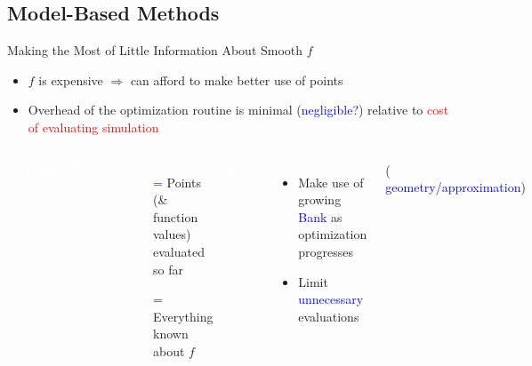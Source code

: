 \documentclass[handout,aspectratio=54]{beamer}
\numberwithin{theorem}{section}
\begin{document}
\subsection{Model-Based Methods}
\begin{frame}{Making the Most of Little Information About Smooth $f$}
\begin{itemize}
\item $f$ is expensive $\Rightarrow$ can afford to make better use of points
\item Overhead of the optimization routine is minimal (\textcolor{blue}{negligible?}) relative to \textcolor{red}{cost of evaluating simulation}
\end{itemize}

\begin{columns}
\includegraphics[width=\textwidth]{fig/20-1.jpg}

\colorbox[rgb]{0.5,0.6,0.7}{\textcolor{white}{\underline{Bank} of data, $\{x^i,f(x^i)\}^k_{i=1}$:}}
\begin{itemize}
\item[\textcolor{blue}{=}] Points (\& function values) evaluated so far
\item[\textcolor{blue}{=}] Everything known about $f$
\end{itemize}

\colorbox[rgb]{0.5,0.6,0.7}{\textcolor{white}{Idea:}}
\begin{itemize}
\item Make use of growing \textcolor{blue}{Bank} as optimization progresses
\item Limit \textcolor{blue}{unnecessary} evaluations
\end{itemize}
\small\flushright
( \textcolor{blue}{geometry/approximation})
\end{columns}
\end{frame}
\end{document}
